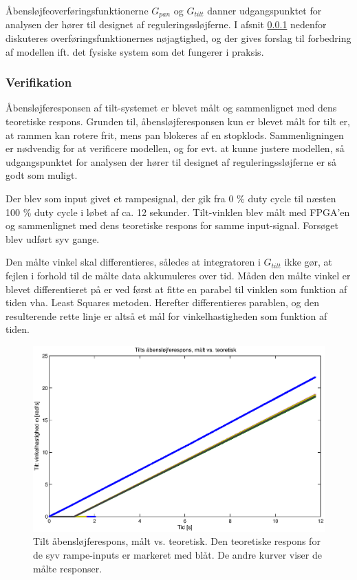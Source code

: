 Åbensløjfeoverføringsfunktionerne \(G_{pan}\) og \(G_{tilt}\) danner udgangspunktet
for analysen der hører til designet af reguleringssløjferne.
I afsnit \ref{subsec:verifikation} nedenfor diskuteres overføringsfunktionernes nøjagtighed,
og der gives forslag til forbedring af modellen ift. det fysiske system som det fungerer
i praksis.

\subsubsection{Verifikation}
\label{subsec:verifikation}
Åbensløjferesponsen af tilt-systemet er blevet målt og sammenlignet med dens teoretiske respons.
Grunden til, åbensløjferesponsen kun er blevet målt for tilt er, at rammen kan rotere frit,
mens pan blokeres af en stopklods.
Sammenligningen er nødvendig for at verificere modellen, og for evt. at kunne justere modellen,
så udgangspunktet for analysen der hører til designet af reguleringssløjferne er så godt som muligt.

Der blev som input givet et rampesignal, der gik fra 0 \% duty cycle til næsten 100 \% duty cycle
i løbet af ca. 12 sekunder. Tilt-vinklen blev målt med FPGA'en og sammenlignet med dens teoretiske
respons for samme input-signal.
Forsøget blev udført syv gange.

Den målte vinkel skal differentieres, således at integratoren i \(G_{tilt}\) ikke gør,
at fejlen i forhold til de målte data akkumuleres over tid.
Måden den målte vinkel er blevet differentieret på er ved først at fitte en parabel
til vinklen som funktion af tiden vha. Least Squares metoden. Herefter differentieres
parablen, og den resulterende rette linje er altså et mål for vinkelhastigheden som funktion af tiden.

\begin{figure}[th!]
	\centering
	\includegraphics[width=1\textwidth]{./graphics/openloopVelocity1.eps}
	\caption[Tilt åbensløjferespons, målt vs. teoretisk]
		{Tilt åbensløjferespons, målt vs. teoretisk.
		Den teoretiske respons for de syv rampe-inputs er markeret med blåt.
		De andre kurver viser de målte responser.}
	\label{fig:openloopV1}
\end{figure}

